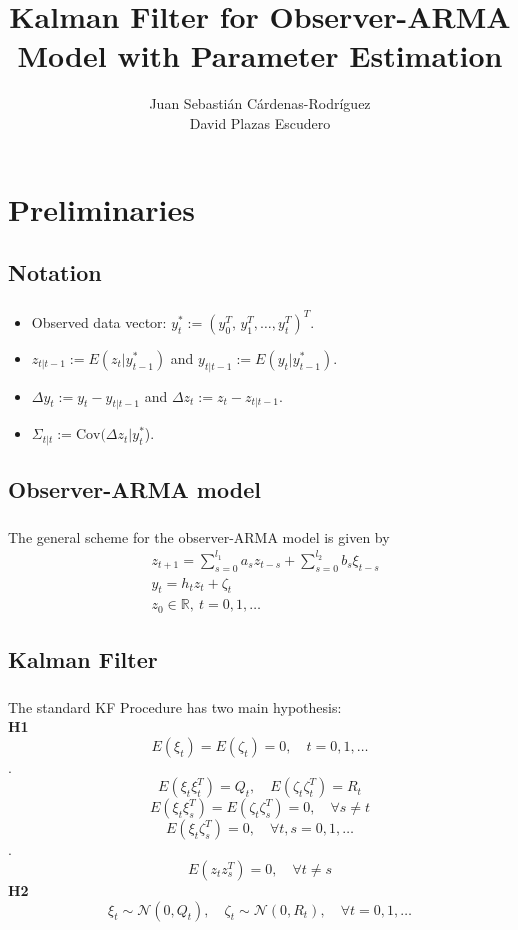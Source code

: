\documentclass{beamer}
\title{Kalman Filter for Observer-ARMA Model with Parameter Estimation}
\author{Juan Sebasti\'an C\'ardenas-Rodríguez \\ David Plazas Escudero  \\ \scalebox{0.7}{Mathematical Engineering, Universidad EAFIT}}
\theoremstyle{definition}
\theoremstyle{remark}
\theoremstyle{example}
\newif\ifinsection
\newif\ifinsubsection
\let\oldsection\section
\renewcommand{\section}{%
  \global\insectiontrue%
  \global\insubsectionfalse%
  \oldsection}
\let\oldsubsection\subsection
\renewcommand{\subsection}{%
  \global\insubsectiontrue%
  \oldsubsection}
\newcommand {\aframe}[1] {%
  \begin{frame}
    \ifinsection\frametitle{\secname}\fi
    \ifinsubsection\framesubtitle{\subsecname}\fi
  #1
  \end{frame}
}
\begin{document}
\begin{frame}[plain]
  \titlepage
\end{frame}

\section{Preliminaries}
\subsection{Notation}
\aframe{
\begin{itemize}
  \item Observed data vector: $y^*_t:=(y_0^T,\,y_1^T,\dots,y_t^T)^T$.
  \item $z_{t|t-1}:=E(z_t|y^*_{t-1})$ and $y_{t|t-1}:=E(y_t|y^*_{t-1})$.
  \item $\Delta y_t:=y_t-y_{t|t-1}$ and $\Delta z_t:=z_t-z_{t|t-1}$.
  \item $\Sigma_{t|t}:=\text{Cov}(\Delta z_t|y_t^*$).
\end{itemize}
}

\subsection{Observer-ARMA model}
\aframe{
The general scheme for the observer-ARMA model is given by
\begin{equation}
  \begin{split}
    &z_{t+1}=\sum_{s=0}^{l_1}a_sz_{t-s}+\sum_{s=0}^{l_2}b_s\xi_{t-s}\\
    &y_t=h_tz_t+\zeta_t\\
    &z_0\in \mathbb{R}, \ t=0,1,\ldots
  \end{split}
\end{equation}
}

\subsection{Kalman Filter}
\aframe{
  The standard KF Procedure \parencite{kalman1960new} has two main hypothesis:\\
  \textbf{H1}
  \[E(\xi_t)=E(\zeta_t)=0, \quad t=0,1,\ldots\].
  \[E(\xi_t\xi_t^T)=Q_t, \quad E(\zeta_t\zeta_t^T)=R_t\]
  \[E(\xi_t\xi_s^T)=E(\zeta_t\zeta_s^T)=0,\quad\forall s\neq t\]\[E(\xi_t\zeta_s^T)=0, \quad \forall t,s=0,1,\ldots\].
  \[E(z_tz_s^T)=0,\quad\forall t\neq s\] \pause
  \textbf{H2}
  \[\xi_t\sim\mathcal{N}(0,Q_t),\quad\zeta_t\sim\mathcal{N}(0,R_t),\quad\forall t=0,1,\ldots\]
}
\end{document}
